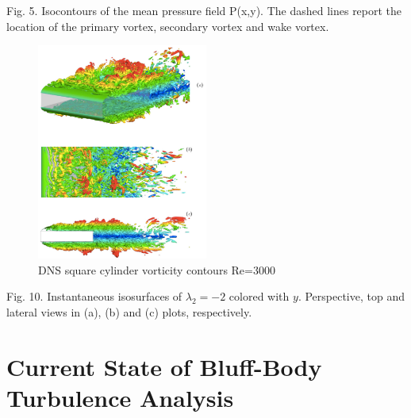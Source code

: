 \documentclass[journal]{new-aiaa}
\begin{document}
Fig. 5. Isocontours of the mean pressure field P(x,y). The dashed lines report the location of the primary vortex, secondary vortex and wake vortex.


\begin{figure}[H]
\begin{center}
\includegraphics[width=0.5\textwidth]{Images/logan/cimarelli2018direct_vorticity.pdf}
\caption{ DNS square cylinder vorticity contours Re=3000 \cite{cimarelli2018direct} }
\label{fig:dnsRectCylPressure}
\end{center}
\end{figure}

Fig. 10. Instantaneous isosurfaces of $\lambda_2=-2$ colored with $y$. Perspective, top and lateral views in (a), (b) and (c) plots, respectively.































\section{Current State of Bluff-Body Turbulence Analysis} \label{sec:currentstate}
\end{document}
